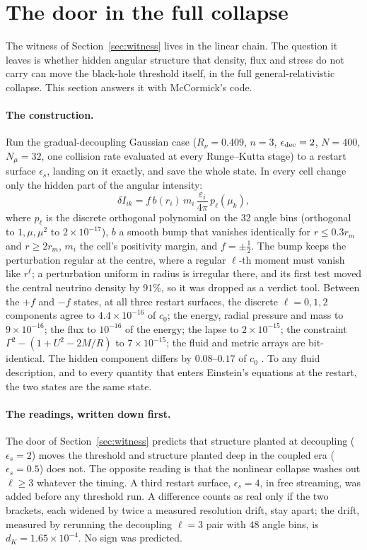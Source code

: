 \section{The door in the full collapse}\label{sec:door}

The witness of Section~\ref{sec:witness} lives in the linear chain. The question it leaves is whether hidden angular structure that density, flux and stress do not carry can move the black-hole threshold itself, in the full general-relativistic collapse. This section answers it with McCormick's code.

\paragraph{The construction.} Run the gradual-decoupling Gaussian case ($R_\nu=0.409$, $n=3$, $\epsilon_{\rm dec}=2$, $N=400$, $N_\mu=32$, one collision rate evaluated at every Runge--Kutta stage) to a restart surface $\epsilon_s$, landing on it exactly, and save the whole state. In every cell change only the hidden part of the angular intensity:
\begin{equation}
\delta I_{ik}=f\,b(r_i)\,m_i\,\frac{\varepsilon_i}{4\pi}\,p_\ell(\mu_k),
\end{equation}
where $p_\ell$ is the discrete orthogonal polynomial on the 32 angle bins (orthogonal to $1,\mu,\mu^2$ to $2\times10^{-17}$), $b$ a smooth bump that vanishes identically for $r\le0.3r_m$ and $r\ge2r_m$, $m_i$ the cell's positivity margin, and $f=\pm\tfrac12$. The bump keeps the perturbation regular at the centre, where a regular $\ell$-th moment must vanish like $r^\ell$; a perturbation uniform in radius is irregular there, and its first test moved the central neutrino density by $91\%$, so it was dropped as a verdict tool. Between the $+f$ and $-f$ states, at all three restart surfaces, the discrete $\ell=0,1,2$ components agree to $4.4\times10^{-16}$ of $c_0$; the energy, radial pressure and mass to $9\times10^{-16}$; the flux to $10^{-16}$ of the energy; the lapse to $2\times10^{-15}$; the constraint $\Gamma^2-(1+U^2-2M/R)$ to $7\times10^{-15}$; the fluid and metric arrays are bit-identical. The hidden component differs by $0.08$--$0.17$ of $c_0$ . To any fluid description, and to every quantity that enters Einstein's equations at the restart, the two states are the same state.

\paragraph{The readings, written down first.} The door of Section~\ref{sec:witness} predicts that structure planted at decoupling ($\epsilon_s=2$) moves the threshold and structure planted deep in the coupled era ($\epsilon_s=0.5$) does not. The opposite reading is that the nonlinear collapse washes out $\ell\ge3$ whatever the timing. A third restart surface, $\epsilon_s=4$, in free streaming, was added before any threshold run. A difference counts as real only if the two brackets, each widened by twice a measured resolution drift, stay apart; the drift, measured by rerunning the decoupling $\ell=3$ pair with $48$ angle bins, is $d_K=1.65\times10^{-4}$. No sign was predicted.


